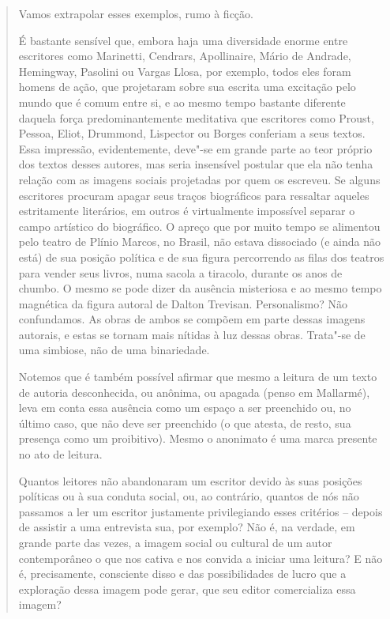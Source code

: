 \begin{quote}
Vamos extrapolar esses exemplos, rumo à ficção.

É bastante sensível que, embora haja uma diversidade enorme entre
escritores como Marinetti, Cendrars, Apollinaire, Mário de Andrade,
Hemingway, Pasolini ou Vargas Llosa, por exemplo, todos eles foram
homens de ação, que projetaram sobre sua escrita uma excitação pelo
mundo que é comum entre si, e ao mesmo tempo bastante diferente daquela
força predominantemente meditativa que escritores como Proust, Pessoa,
Eliot, Drummond, Lispector ou Borges conferiam a seus textos. Essa
impressão, evidentemente, deve"-se em grande parte ao teor próprio dos
textos desses autores, mas seria insensível postular que ela não tenha
relação com as imagens sociais projetadas por quem os escreveu. Se
alguns escritores procuram apagar seus traços biográficos para ressaltar
aqueles estritamente literários, em outros é virtualmente impossível
separar o campo artístico do biográfico. O apreço que por muito tempo se
alimentou pelo teatro de Plínio Marcos, no Brasil, não estava dissociado
(e ainda não está) de sua posição política e de sua figura percorrendo
as filas dos teatros para vender seus livros, numa sacola a tiracolo,
durante os anos de chumbo. O mesmo se pode dizer da ausência misteriosa
e ao mesmo tempo magnética da figura autoral de Dalton Trevisan.
Personalismo? Não confundamos. As obras de ambos se compõem em parte
dessas imagens autorais, e estas se tornam mais nítidas à luz dessas
obras. Trata"-se de uma simbiose, não de uma binariedade.

Notemos que é também possível afirmar que mesmo a leitura de um texto de
autoria desconhecida, ou anônima, ou apagada (penso em Mallarmé), leva
em conta essa ausência como um espaço a ser preenchido ou, no último
caso, que não deve ser preenchido (o que atesta, de resto, sua presença
como um proibitivo). Mesmo o anonimato é uma marca presente no ato de
leitura.

Quantos leitores não abandonaram um escritor devido às suas posições
políticas ou à sua conduta social, ou, ao contrário, quantos de nós não
passamos a ler um escritor justamente privilegiando esses critérios --
depois de assistir a uma entrevista sua, por exemplo? Não é, na verdade,
em grande parte das vezes, a imagem social ou cultural de um autor
contemporâneo o que nos cativa e nos convida a iniciar uma leitura? E
não é, precisamente, consciente disso e das possibilidades de lucro que
a exploração dessa imagem pode gerar, que seu editor comercializa essa
imagem?


\end{quote}
